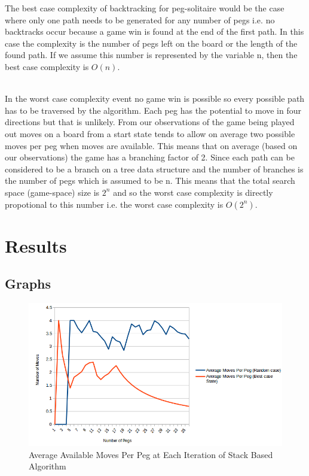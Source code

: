 \documentclass[a4paper]{article}
\begin{document}
\noindent The best case complexity of backtracking for peg-solitaire would be the case where only one path needs to be generated for any number of pegs i.e. no backtracks occur because a game win is found at the end of the first path. In this case the complexity is the number of pegs left on the board or the length of the found path. If we assume this number is represented by the variable n, then the best case complexity is $O(n)$.\\\


\noindent In the worst case complexity event no game win is possible so every possible path has to be traversed by the algorithm. Each peg has the potential to move in four directions but that is unlikely. From our observations of the game being played out moves on a board from a start state tends to allow on average two possible moves per peg when moves are available. This means that on average (based on our observations) the game has a branching factor of 2. Since each path can be considered to be a branch on a tree data structure and the number of branches is the number of pegs which is assumed to be n. This means that the total search space (game-space) size is $2^n$ and so the worst case complexity is directly propotional to this number i.e. the worst case complexity is $O(2^n)$. 

\section{Results}
\subsection{Graphs}
\begin{figure}[H]
	\centering
	\label{avgnumpegs}
	\includegraphics[width=.90\textwidth,scale=.90]{images/AverageNumPegs}
	\caption{Average Available Moves Per Peg at Each Iteration of Stack Based Algorithm}
\end{figure}
\end{document}
